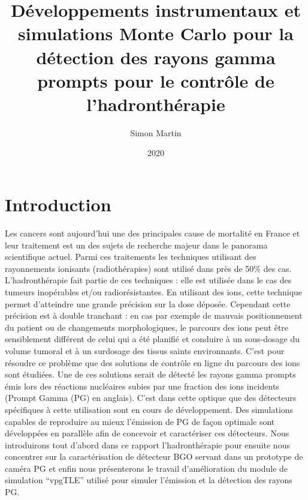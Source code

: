 \documentclass[11pt,a4paper,oldfontcommands]{memoir}
\begin{document}
\title{Développements instrumentaux et simulations Monte Carlo pour la détection des rayons gamma prompts pour le contrôle de l’hadronthérapie}
\author{Simon Martin}

\date {2020}



\maketitle
\newpage
\tableofcontents
\openany
\chapter{Introduction}
Les cancers sont aujourd'hui une des principales cause de mortalité en France et leur traitement est un des sujets de recherche majeur dans le panorama scientifique actuel. Parmi ces traitements les techniques utilisant des rayonnements ionisants (radiothérapies) sont utilisé dans près de 50\% des cas. L'hadronthérapie fait partie de ces techniques
: elle est utilisée dans le cas des tumeurs inopérables et/ou radiorésistantes. En utilisant des ions, cette technique permet d'atteindre une grande précision sur la dose déposée. Cependant cette précision est à double tranchant : en cas par exemple de mauvais positionnement du patient ou de changements morphologiques, le parcours des ions peut être sensiblement différent de celui qui a été planifié et conduire à un sous-dosage du volume tumoral et à un surdosage des tissus saints environnants. C'est pour résoudre ce problème que des solutions de contrôle en ligne du parcours des ions sont étudiées. Une de ces solutions serait de détecté les rayons gamma prompts émis lors des réactions nucléaires subies par une fraction des ions incidents (Prompt Gamma (PG) en anglais). C'est dans cette optique que des détecteurs spécifiques à cette utilisation sont en cours de développement. Des simulations capables de reproduire au mieux l'émission de PG de façon optimale sont développées en parallèle afin de concevoir et caractériser ces détecteurs. Nous introduirons tout d'abord dans ce rapport l'hadronthérapie pour ensuite nous concentrer sur la caractérisation de détecteur BGO servant dans un prototype de caméra PG et enfin nous présenterons le travail d'amélioration du module de simulation \enquote{vpgTLE} utilisé pour simuler l'émission et la détection des rayons PG. 
\openany
\end{document}

